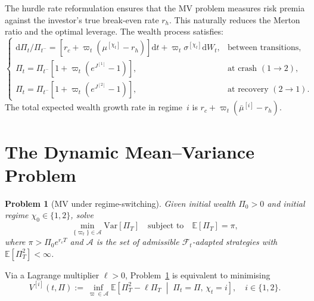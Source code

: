 \documentclass[11pt,a4paper]{article}
\numberwithin{equation}{section}
\newtheorem{problem}[theorem]{Problem}
\newcommand{\E}{\mathbb{E}}
\newcommand{\Var}{\mathrm{Var}}
\newcommand{\F}{\mathcal{F}}
\newcommand{\dd}{\mathrm{d}}
\begin{document}
The hurdle rate reformulation ensures that the MV problem measures risk premia against the investor's true break-even rate $r_h$. This naturally reduces the Merton ratio and the optimal leverage. The wealth process satisfies:
\begin{equation}\label{eq:wealth_sde}
\begin{cases}
\dd \Pi_t / \Pi_{t^-} = [r_c + \varpi_t (\mu^{[\chi_t]} - r_h)] \dd t + \varpi_t \sigma^{[\chi_t]} \dd W_t, & \text{between transitions,} \\[4pt]
\Pi_t = \Pi_{t^-} [1 + \varpi_t (e^{J^{[1]}} - 1)], & \text{at crash } (1 \to 2), \\[4pt]
\Pi_t = \Pi_{t^-} [1 + \varpi_t (e^{J^{[2]}} - 1)], & \text{at recovery } (2 \to 1).
\end{cases}
\end{equation}
The total expected wealth growth rate in regime~$i$ is $r_c + \varpi_t(\bar{\mu}^{[i]} - r_h)$.


\section{The Dynamic Mean--Variance Problem}\label{sec:mv}


\begin{problem}[MV under regime-switching]\label{prob:mv}
Given initial wealth $\Pi_0 > 0$ and initial regime $\chi_0 \in \{1,2\}$, solve
\begin{equation}\label{eq:mv_problem}
\min_{\{\varpi_t\} \in \mathcal{A}} \Var[\Pi_T] \quad \text{subject to} \quad \E[\Pi_T] = \pi,
\end{equation}
where $\pi > \Pi_0 e^{r_c T}$ and $\mathcal{A}$ is the set of admissible $\F_t$-adapted strategies with $\E[\Pi_T^2] < \infty$.
\end{problem}

Via a Lagrange multiplier $\ell > 0$, Problem~\ref{prob:mv} is equivalent to minimising
\begin{equation}\label{eq:J_def}
V^{[i]}(t, \Pi) := \inf_{\varpi \in \mathcal{A}} \E\!\left[\Pi_T^2 - \ell \Pi_T \;\middle|\; \Pi_t = \Pi,\, \chi_t = i\right], \quad i \in \{1,2\}.
\end{equation}
\end{document}
